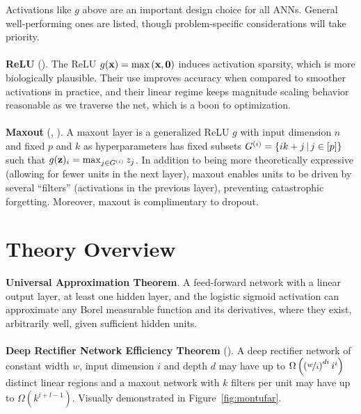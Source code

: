 \documentclass{article}
\begin{document}
Activations like $g$ above are an important design choice for all ANNs. General well-performing ones are listed, though problem-specific considerations will take priority.
\\\\
\noindent
\textbf{ReLU} (). The ReLU $g(\textbf{x})=\max\left({\textbf{x},\textbf{0}}\right)$ induces activation sparsity, which is more biologically plausible. Their use improves accuracy when compared to smoother activations in practice, and their linear regime keeps magnitude scaling behavior reasonable as we traverse the net, which is a boon to optimization.
\\\\
\noindent
\textbf{Maxout} (, ). A maxout layer is a generalized ReLU $g$ with input dimension $n$ and fixed $p$ and $k$ as hyperparameters has fixed subsets $G^{(i)}=\left\{ ik+j \,\middle|\, j\in[p] \right\}$ such that $g(\textbf{z})_i=\max_{j\in G^{(i)}}z_j$. In addition to being more theoretically expressive (allowing for fewer units in the next layer), maxout enables units to be driven by several ``filters'' (activations in the previous layer), preventing catastrophic forgetting. Moreover, maxout is complimentary to dropout.

\section{Theory Overview}

\noindent
\textbf{Universal Approximation Theorem}. A feed-forward network with a linear output layer, at least one hidden layer, and the logistic sigmoid activation can approximate any Borel measurable function and its derivatives, where they exist, arbitrarily well, given sufficient hidden units.
\\\\
\noindent
\textbf{Deep Rectifier Network Efficiency Theorem} (). A deep rectifier network of constant width $w$, input dimension $i$ and depth $d$ may have up to $\Omega\left({\left({\nicefrac{w}{i}}\right)^{di}i^i}\right)$ distinct linear regions and a maxout network with $k$ filters per unit may have up to $\Omega(k^{i+l-1})$. Visually demonstrated in Figure~\ref{fig:montufar}.
\end{document}
